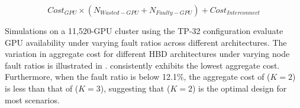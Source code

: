 \vspace{-1em}
$$Cost_{GPU} \times (N_{Wasted-GPU} + N_{Faulty-GPU}) + Cost_{Interconnect}$$


Simulations on a 11,520-GPU cluster using the TP-32 configuration evaluate GPU availability under varying fault ratios across different architectures.
The variation in aggregate cost for different HBD architectures under varying node fault ratios is illustrated in . \sys{} consistently exhibits the lowest aggregate cost. Furthermore, when the fault ratio is below 12.1\%, the aggregate cost of \sys{} ($K=2$) is less than that of \sys{} ($K = 3$), suggesting that ($K = 2$) is the optimal design for most scenarios.







